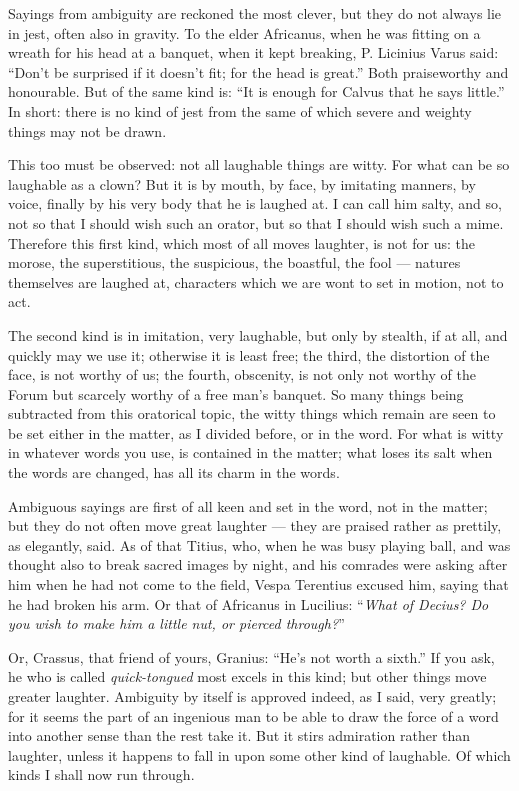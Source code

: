  Sayings from ambiguity are reckoned the most clever, but they do not always lie in jest, often also in gravity. To the elder Africanus, when he was fitting on a wreath for his head at a banquet, when it kept breaking, P. Licinius Varus said: ``Don't be surprised if it doesn't fit; for the head is great.'' Both praiseworthy and honourable. But of the same kind is: ``It is enough for Calvus that he says little.'' In short: there is no kind of jest from the same of which severe and weighty things may not be drawn.

 This too must be observed: not all laughable things are witty. For what can be so laughable as a clown? But it is by mouth, by face, by imitating manners, by voice, finally by his very body that he is laughed at. I can call him salty, and so, not so that I should wish such an orator, but so that I should wish such a mime. Therefore this first kind, which most of all moves laughter, is not for us: the morose, the superstitious, the suspicious, the boastful, the fool — natures themselves are laughed at, characters which we are wont to set in motion, not to act.

 The second kind is in imitation, very laughable, but only by stealth, if at all, and quickly may we use it; otherwise it is least free; the third, the distortion of the face, is not worthy of us; the fourth, obscenity, is not only not worthy of the Forum but scarcely worthy of a free man's banquet. So many things being subtracted from this oratorical topic, the witty things which remain are seen to be set either in the matter, as I divided before, or in the word. For what is witty in whatever words you use, is contained in the matter; what loses its salt when the words are changed, has all its charm in the words.

 Ambiguous sayings are first of all keen and set in the word, not in the matter; but they do not often move great laughter — they are praised rather as prettily, as elegantly, said. As of that Titius, who, when he was busy playing ball, and was thought also to break sacred images by night, and his comrades were asking after him when he had not come to the field, Vespa Terentius excused him, saying that he had broken his arm. Or that of Africanus in Lucilius: ``\textit{What of Decius? Do you wish to make him a little nut, or pierced through?}''

 Or, Crassus, that friend of yours, Granius: ``He's not worth a sixth.'' If you ask, he who is called \textit{quick-tongued} most excels in this kind; but other things move greater laughter. Ambiguity by itself is approved indeed, as I said, very greatly; for it seems the part of an ingenious man to be able to draw the force of a word into another sense than the rest take it. But it stirs admiration rather than laughter, unless it happens to fall in upon some other kind of laughable. Of which kinds I shall now run through.

